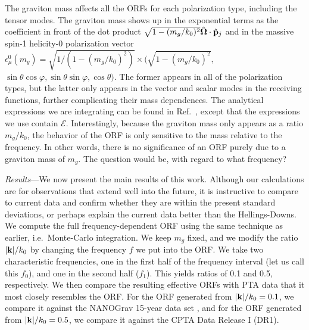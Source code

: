 \documentclass[prd,twocolumn,aps,psfig,nofootinbib,nobibnotes,superscriptaddress,preprintnumbers,times]{revtex4-2}
\begin{document}
The graviton mass affects all the ORFs for each polarization type, including the tensor modes. The graviton mass shows up in the exponential terms as the coefficient in front of the dot product $\sqrt{1 - (m_g/k_0)^2}\hat{\bf \Omega}\cdot \hat{\bf p}_j$ and in the massive spin-1 helicity-0 polarization vector $\epsilon_\mu^0(m_g) = \sqrt{1 / (1 - (m_g/k_0)^2)}\times (\sqrt{1 - (m_g/k_0)^2},$ $\sin\theta\cos\varphi, \sin\theta\sin\varphi, \cos\theta)$. The former appears in all of the polarization types, but the latter only appears in the vector and scalar modes in the receiving functions, further complicating their mass dependences. The analytical expressions we are integrating can be found in Ref.\ \cite{Liang:2021bct}, except that the expressions we use contain $\mathcal{E}$. Interestingly, because the graviton mass only appears as a ratio $m_g / k_0$, the behavior of the ORF is only sensitive to the mass relative to the frequency. In other words, there is no significance of an ORF purely due to a graviton mass of $m_g$. The question would be, with regard to what frequency?

\textit{Results}---We now present the main results of this work. Although our calculations are for observations that extend well into the future, it is instructive to compare to current data and confirm whether they are within the present standard deviations, or perhaps explain the current data better than the Hellings-Downs. We compute the full frequency-dependent ORF using the same technique as earlier, i.e.\ Monte-Carlo integration. We keep $m_g$ fixed, and we modify the ratio $|{\bf k}|/k_0$ by changing the frequency $f$ we put into the ORF. We take two characteristic frequencies, one in the first half of the frequency interval (let us call this $f_0$), and one in the second half ($f_1$). This yields ratios of 0.1 and 0.5, respectively. We then compare the resulting effective ORFs with PTA data that it most closely resembles the ORF. For the ORF generated from $|{\bf k}|/k_0 = 0.1$, we compare it against the NANOGrav 15-year data set \cite{Agazie:2023}, and for the ORF generated from $|{\bf k}|/k_0 = 0.5$, we compare it against the CPTA Data Release I (DR1).
\end{document}
